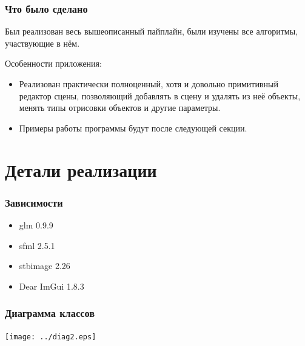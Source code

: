 \documentclass{beamer}
\begin{document}
\begin{frame}
	\frametitle{Что было сделано}
	
	Был реализован весь вышеописанный пайплайн, были изучены все алгоритмы, участвующие в нём. 
	
	Особенности приложения: 
	
	\begin{itemize}
		\item<1-> Реализован практически полноценный, хотя и довольно примитивный редактор сцены, позволяющий добавлять в сцену и удалять из неё объекты, менять типы отрисовки объектов и другие параметры.
		
		\item<2-> Примеры работы программы будут после следующей секции.
		
	\end{itemize}
\end{frame}

\section{Детали реализации}

\begin{frame}
	\frametitle{Зависимости}
	
	\begin{itemize}
		\item<1-> glm 0.9.9
		\item<2-> sfml 2.5.1
		\item<3-> stb\textunderscore image 2.26
		\item<4-> Dear ImGui 1.8.3
	\end{itemize}
	
\end{frame}

\begin{frame}
	\frametitle{Диаграмма классов}
	
	\texttt{[image: ../diag2.eps]} 
\end{frame}
	
\end{document}
